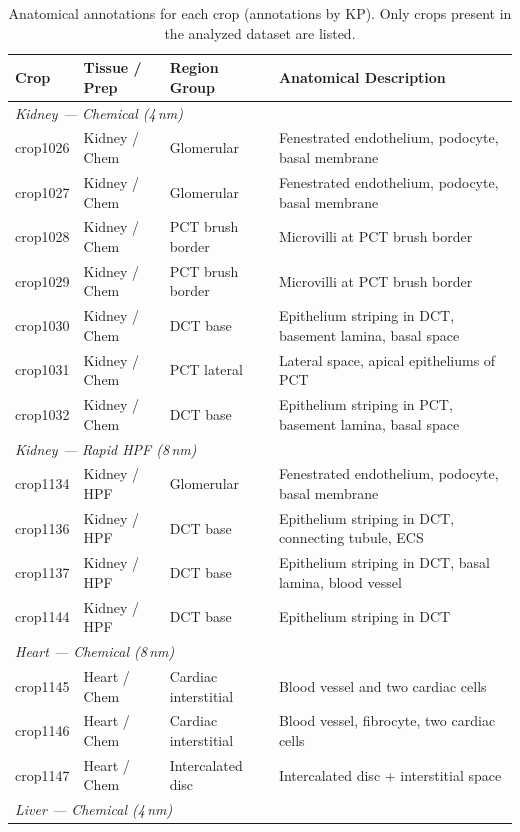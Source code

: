 \documentclass[times, twoside]{zHenriquesLab-StyleBioRxiv}
\begin{document}
\begin{table}[t]
\centering
\caption{Anatomical annotations for each crop (annotations by KP). Only crops present in the analyzed dataset are listed.}
\label{tab:annotations}
\footnotesize
\begin{tabular}{llp{2.5cm}p{5.5cm}}
\toprule
Crop & Tissue / Prep & Region Group & Anatomical Description \\
\midrule
\multicolumn{4}{l}{\textit{Kidney --- Chemical (4\,nm)}} \\
crop1026 & Kidney / Chem & Glomerular & Fenestrated endothelium, podocyte, basal membrane \\
crop1027 & Kidney / Chem & Glomerular & Fenestrated endothelium, podocyte, basal membrane \\
crop1028 & Kidney / Chem & PCT brush border & Microvilli at PCT brush border \\
crop1029 & Kidney / Chem & PCT brush border & Microvilli at PCT brush border \\
crop1030 & Kidney / Chem & DCT base & Epithelium striping in DCT, basement lamina, basal space \\
crop1031 & Kidney / Chem & PCT lateral & Lateral space, apical epitheliums of PCT \\
crop1032 & Kidney / Chem & DCT base & Epithelium striping in PCT, basement lamina, basal space \\
\midrule
\multicolumn{4}{l}{\textit{Kidney --- Rapid HPF (8\,nm)}} \\
crop1134 & Kidney / HPF & Glomerular & Fenestrated endothelium, podocyte, basal membrane \\
crop1136 & Kidney / HPF & DCT base & Epithelium striping in DCT, connecting tubule, ECS \\
crop1137 & Kidney / HPF & DCT base & Epithelium striping in DCT, basal lamina, blood vessel \\
crop1144 & Kidney / HPF & DCT base & Epithelium striping in DCT \\
\midrule
\multicolumn{4}{l}{\textit{Heart --- Chemical (8\,nm)}} \\
crop1145 & Heart / Chem & Cardiac interstitial & Blood vessel and two cardiac cells \\
crop1146 & Heart / Chem & Cardiac interstitial & Blood vessel, fibrocyte, two cardiac cells \\
crop1147 & Heart / Chem & Intercalated disc & Intercalated disc + interstitial space \\
\midrule
\multicolumn{4}{l}{\textit{Liver --- Chemical (4\,nm)}} \\

\end{tabular}
\end{table}
\end{document}

